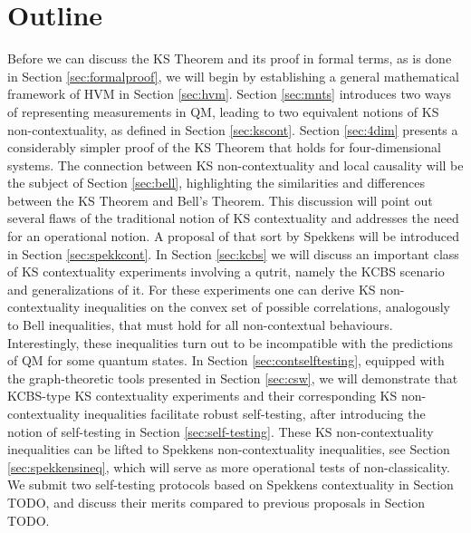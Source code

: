 \section{Outline}
Before we can discuss the KS Theorem and its proof in formal terms, as is done in Section \ref{sec:formalproof}, we will begin by establishing a general mathematical framework of HVM in Section \ref{sec:hvm}. Section \ref{sec:mnts} introduces two ways of representing measurements in QM, leading to two equivalent notions of KS non-contextuality, as defined in Section \ref{sec:kscont}. Section \ref{sec:4dim} presents a considerably simpler proof of the KS Theorem that holds for four-dimensional systems. The connection between KS non-contextuality and local causality will be the subject of Section \ref{sec:bell}, highlighting the similarities and differences between the KS Theorem and Bell's Theorem. This discussion will point out several flaws of the traditional notion of KS contextuality and addresses the need for an operational notion. A proposal of that sort by Spekkens will be introduced in Section \ref{sec:spekkcont}. In Section \ref{sec:kcbs} we will discuss an important class of KS contextuality experiments involving a qutrit, namely the KCBS scenario and generalizations of it. For these experiments one can derive KS non-contextuality inequalities on the convex set of possible correlations, analogously to Bell inequalities, that must hold for all non-contextual behaviours. Interestingly, these inequalities turn out to be incompatible with the predictions of QM for some quantum states. In Section \ref{sec:contselftesting}, equipped with the graph-theoretic tools presented in Section \ref{sec:csw}, we will demonstrate that KCBS-type KS contextuality experiments and their corresponding KS non-contextuality inequalities facilitate robust self-testing, after introducing the notion of self-testing in Section \ref{sec:self-testing}. These KS non-contextuality inequalities can be lifted to Spekkens non-contextuality inequalities, see Section \ref{sec:spekkensineq}, which will serve as more operational tests of non-classicality.
We submit two self-testing protocols based on Spekkens contextuality in Section TODO, and discuss their merits compared to previous proposals in Section TODO.

